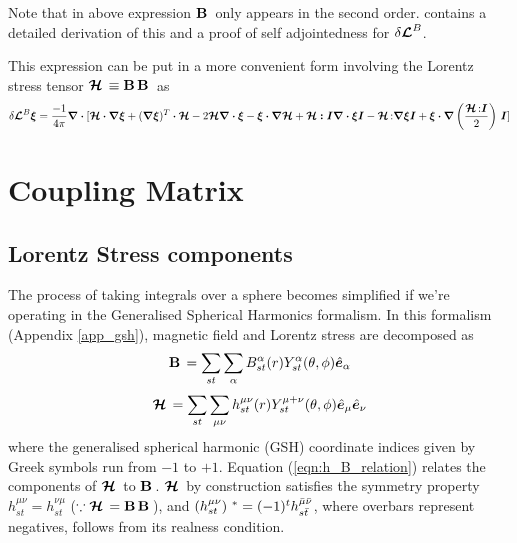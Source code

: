 Note that in above expression $\mathbf{B}\,$ only appears in the second order. \cite{goedbloed2004} contains a detailed derivation of this and a proof of self adjointedness for $\delta \bm{\mathcal{L}}^B$.

This expression can be put in a more convenient form involving the Lorentz stress tensor $\bm{\mathcal{H}}\, \equiv \mathbf{B}\,\mathbf{B}\,$ as
\begin{equation} \label{eqn: mag_pert_H}
    \delta \bm{\mathcal{L}}^{B} \boldsymbol{\xi} = \frac{-1}{4\pi}\boldsymbol{\nabla\cdot} [\boldsymbol{\mathcal{H}\cdot\nabla \xi} + (\boldsymbol{\nabla \xi})^T \boldsymbol{\cdot \mathcal{H}} - 2\boldsymbol{\mathcal{H}\nabla \cdot \xi} - \boldsymbol{\xi \cdot \nabla \mathcal{H}} + \boldsymbol{\mathcal{H}:I \nabla \cdot \xi I} - \bm{\mathcal{H}}\,{:}\boldsymbol{\nabla \xi I} + \boldsymbol{\xi \cdot \nabla} \left( \frac{\bm{\mathcal{H}}\,{:}\boldsymbol{I}}{2} \right)\,\boldsymbol{I}]
\end{equation}

\section{Coupling Matrix}
\subsection{Lorentz Stress components}\label{sec:lorentz_stress_comps}
The process of taking integrals over a sphere becomes simplified if we're operating in the Generalised Spherical Harmonics formalism. In this formalism (Appendix \ref{app_gsh}), magnetic field and Lorentz stress are decomposed as
$$\mathbf{B}\, = \sum_{st}\sum_{\alpha} B^{\alpha}_{st}(r) Y_{st}^{\alpha}(\theta,\phi) \hat{\bm{e}}_{\alpha}$$
$$\bm{\mathcal{H}}\, = \sum_{st}\sum_{\mu\nu} h_{st}^{\mu\nu}(r) Y^{\mu+\nu}_{st}(\theta,\phi) \hat{\bm{e}}_{\mu}\hat{\bm{e}}_{\nu}$$
where the generalised spherical harmonic (GSH) coordinate indices given by Greek symbols run from $-1$ to $+1$.
Equation (\ref{eqn:h_B_relation}) relates the components of $\bm{\mathcal{H}}\,$ to $\mathbf{B}\,$. $\bm{\mathcal{H}}\,$ by construction satisfies the symmetry property $h^{\mu\nu}_{st} = h^{\nu\mu}_{st}$ ($\because \bm{\mathcal{H}}\, = \mathbf{B}\,\mathbf{B}\,$), and $\left( h^{\mu\nu}_{st} \right)\,^* = (-1)^t h_{s\bar{t}}^{\bar{\mu}\bar{\nu}}$, where overbars represent negatives, follows from its realness condition.

